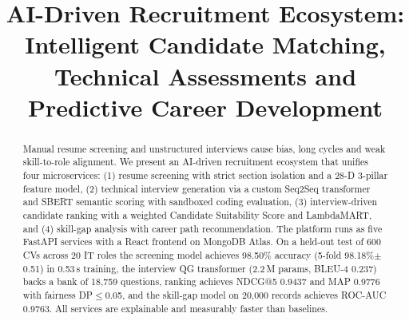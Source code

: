 \documentclass[conference]{IEEEtran}
\begin{document}
\title{AI-Driven Recruitment Ecosystem: Intelligent Candidate Matching, Technical Assessments and Predictive Career Development}

\author{
\and
{}
\and
{}
}

\maketitle

\begin{abstract}
Manual resume screening and unstructured interviews cause bias, long cycles and weak skill-to-role alignment. We present an AI-driven recruitment ecosystem that unifies four microservices: (1) resume screening with strict section isolation and a 28-D 3-pillar feature model, (2) technical interview generation via a custom Seq2Seq transformer and SBERT semantic scoring with sandboxed coding evaluation, (3) interview-driven candidate ranking with a weighted Candidate Suitability Score and LambdaMART, and (4) skill-gap analysis with career path recommendation. The platform runs as five FastAPI services with a React frontend on MongoDB Atlas. On a held-out test of 600 CVs across 20 IT roles the screening model achieves 98.50\% accuracy (5-fold 98.18\%$\pm$0.51) in 0.53\,s training, the interview QG transformer (2.2\,M params, BLEU-4 0.237) backs a bank of 18,759 questions, ranking achieves NDCG@5 0.9437 and MAP 0.9776 with fairness DP$\leq$0.05, and the skill-gap model on 20,000 records achieves ROC-AUC 0.9763. All services are explainable and measurably faster than baselines.
\end{abstract}
\end{document}
